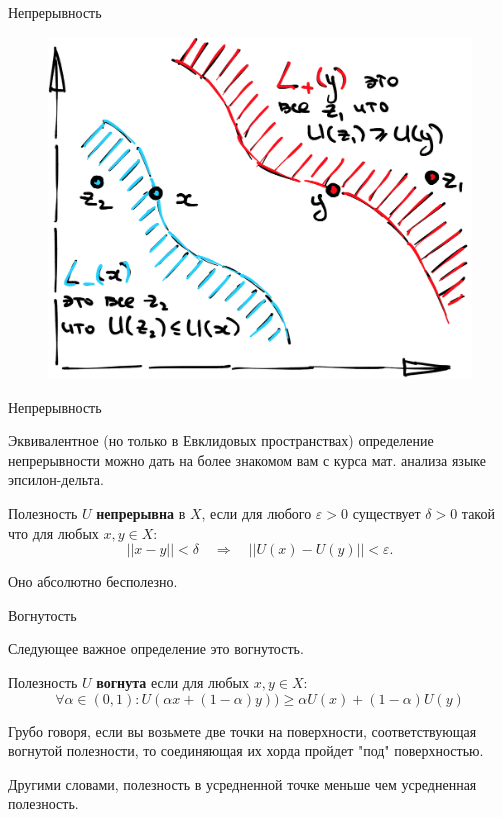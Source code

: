 \documentclass{beamer}
\begin{document}
\begin{frame}{Непрерывность}

\begin{figure}[hbt]
\centering
\includegraphics[width=.8 \textwidth]{lebeg_sets.png}
\end{figure}

\end{frame}

\begin{frame}{Непрерывность}

Эквивалентное (но только в Евклидовых пространствах) определение непрерывности можно дать на более знакомом вам с курса мат. анализа языке эпсилон-дельта.

\begin{definition} Полезность $U$ \textbf{непрерывна} в $X$, если для любого $\varepsilon > 0$ существует $\delta >0$ такой что для любых $x, y \in X$: $$ ||x - y|| < \delta \quad \Rightarrow \quad ||U(x) - U(y)|| < \varepsilon.$$	
\end{definition}

Оно абсолютно бесполезно.

\end{frame}

\begin{frame}{Вогнутость}

Следующее важное определение это вогнутость.

\begin{definition}
Полезность $U$ \textbf{вогнута} если для любых $x, y \in X$: 
$$ \forall \alpha \in (0,1): U(\alpha x + (1-\alpha) y)) \geqslant \alpha U(x) + (1-\alpha) U(y)$$
\end{definition}

Грубо говоря, если вы возьмете две точки на поверхности, соответствующая вогнутой полезности, то соединяющая их хорда пройдет "под" поверхностью. 

Другими словами, полезность в усредненной точке меньше чем усредненная полезность.

\end{frame}
\end{document}

